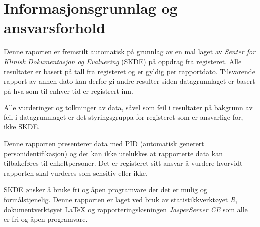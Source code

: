 %

\section{Informasjonsgrunnlag og ansvarsforhold}
Denne raporten er fremstilt automatisk på grunnlag av en mal laget av
\textit{Senter for Klinisk Dokumentasjon og Evaluering} (SKDE) på oppdrag
fra registeret. Alle resultater
er basert på tall fra registeret og er gyldig per rapportdato. Tilsvarende
rapport av annen dato kan derfor gi andre resulter siden datagrunnlaget er
basert på hva som til enhver tid er registrert inn.
\par
Alle vurderinger og tolkninger av data, såvel som feil i resultater på
bakgrunn av feil i datagrunnlaget er det styringsgruppa for
registeret som er ansvarlige for, ikke SKDE.
\par
Denne rapporten presenterer data med PID (automatisk generert personidentifikasjon) og det kan ikke utelukkes
at rapporterte data kan tilbakeføres til enkeltpersoner. Det er registeret sitt ansvar
å vurdere hvorvidt rapporten skal vurderes som sensitiv eller ikke.
\par
SKDE ønsker å bruke fri og åpen programvare der det er mulig og
formålstjenelig. Denne rapporten er laget ved bruk av statistikkverktøyet
\textit{R}, dokumentverktøyet \LaTeX{} og rapporteringsløsningen
\textit{JasperServer CE} som alle er fri og åpen programvare.


